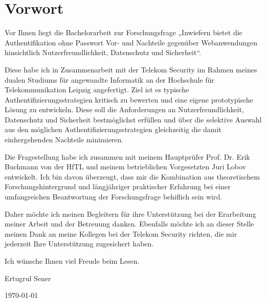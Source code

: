 \chapter{Vorwort}
Vor Ihnen liegt die Bachelorarbeit zur Forschungsfrage „Inwiefern bietet die Authentifikation ohne Passwort Vor- und Nachteile gegenüber Webanwendungen hinsichtlich Nutzerfreundlichkeit, Datenschutz und Sicherheit“.

Diese habe ich in Zusammenarbeit mit der Telekom Security im Rahmen meines dualen Studiums für angewandte Informatik an der Hochschule für Telekommunikation Leipzig angefertigt. Ziel ist es typische Authentifizierungsstrategien kritisch zu bewerten und eine eigene prototypische Lösung zu entwickeln. Diese soll die Anforderungen an Nutzerfreundlichkeit, Datenschutz und Sicherheit bestmöglichst erfüllen und über die selektive Auswahl aus den möglichen Authentifizierungsstrategien gleichzeitig die damit einhergehenden Nachteile minimieren.

Die Fragestellung habe ich zusammen mit meinem Hauptprüfer Prof. Dr. Erik Buchmann von der HfTL und meinem betrieblichen Vorgesetzten Juri Lobov entwickelt. Ich bin davon überzeugt, dass mir die Kombination aus theoretischem Forschungshintergrund und längjähriger praktischer Erfahrung bei einer umfangreichen Beantwortung der Forschungsfrage behiflich sein wird.

Daher möchte ich meinen Begleitern für ihre Unterstützung bei der Erarbeitung meiner Arbeit und der Betreuung danken. Ebenfalls möchte ich an dieser Stelle meinen Dank an meine Kollegen bei der Telekom Security richten, die mir jederzeit Ihre Unterstützung zugesichert haben.

Ich wünsche Ihnen viel Freude beim Lesen.

Ertugrul Sener

\today
